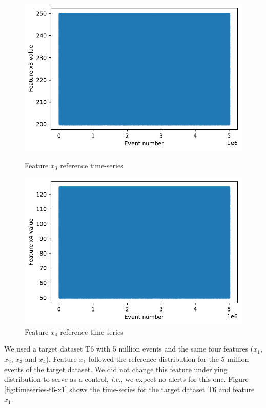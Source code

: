 \begin{figure}[!htb]
\begin{minipage}[b]{0.5\linewidth}
    \includegraphics[width=1\linewidth]{figures/timeseries-r6-x3.pdf} 
    \caption{Feature $x_3$ reference time-series} 
    \label{fig:timeseries-r6-x3} 
    \vspace{4ex}
  \end{minipage}%
  \begin{minipage}[b]{0.5\linewidth}
    \centering
    \includegraphics[width=1\linewidth]{figures/timeseries-r6-x4.pdf} 
    \caption{Feature $x_4$ reference time-series} 
    \label{fig:timeseries-r6-x4} 
    \vspace{4ex}
  \end{minipage} 
\end{figure}

We used a target dataset T6 with 5 million events and the same four features ($x_1$, $x_2$, $x_3$ and $x_4$). Feature $x_1$ followed the reference distribution for the 5 million events of the target dataset. We did not change this feature underlying distribution to serve as a control, \textit{i.e.}, we expect no alerts for this one. Figure \ref{fig:timeseries-t6-x1} shows the time-series for the target dataset T6 and feature $x_1$.

